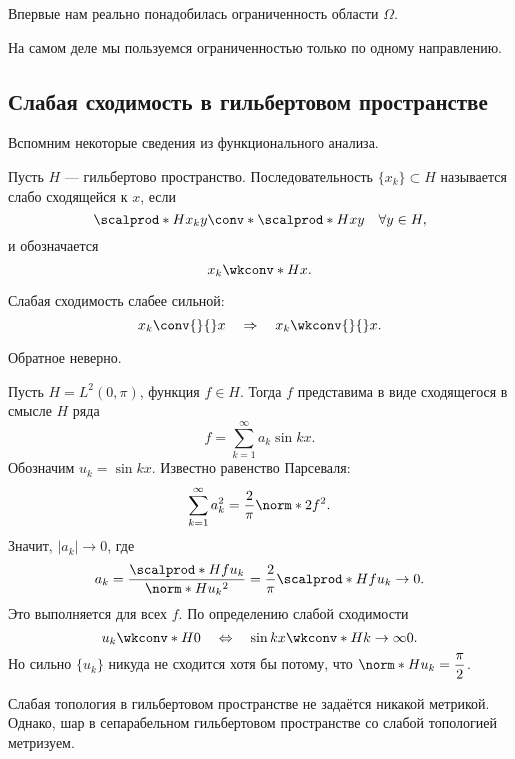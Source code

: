\begin{note}
Впервые нам реально понадобилась ограниченность области $\Omega$.
\end{note}

\begin{note}
На самом деле мы пользуемся ограниченностью только по одному направлению. 
\end{note}

\subsection{Слабая сходимость в гильбертовом пространстве}
Вспомним некоторые сведения из функционального анализа.
\begin{definition}
Пусть $H$ --- гильбертово пространство. Последовательность $\{x_k \} \subset H$ называется слабо сходящейся к $x$, если
$$\scalprod*{H}{x_k}{y} \conv*{}{} \scalprod*{H}{x}{y} \quad \forall y \in H,$$
и обозначается
$$ x_k \wkconv*{H}{} x.$$
\end{definition}

\begin{note}
Слабая сходимость слабее сильной:
$$ x_k \conv{}{} x \quad \Rightarrow \quad x_k \wkconv{}{} x.$$
\end{note}

\begin{note}
Обратное неверно.
\end{note}

\begin{example} Пусть $H = L^2(0, \pi)$, функция $f \in H$. Тогда $f$ представима в виде сходящегося в смысле $H$ ряда
$$ f = \sum_{k=1}^\infty a_k \sin kx.$$
Обозначим $u_k = \sin kx$. Известно равенство Парсеваля:
$$ \sum_{k=1}^\infty a_k^2 = \frac {2} {\pi} \norm*{2}{f}^2.$$
Значит, $|a_k| \to 0$, где
$$ a_k = \frac {\scalprod*{H}{f}{u_k}} {\norm*{H}{u_k}^2} = \frac {2} {\pi} \scalprod*{H}{f}{u_k} \to 0.$$
Это выполняется для всех $f$. По определению слабой сходимости
$$ u_k \wkconv*{H}{} 0 \quad \Leftrightarrow \quad \sin kx \wkconv*{H}{k \to \infty} 0.$$
Но сильно $\{ u_k \}$ никуда не сходится хотя бы потому, что $\displaystyle \norm*{H}{u_k} = \frac {\pi} {2}$.
\end{example}

\begin{note}
Слабая топология в гильбертовом пространстве не задаётся никакой метрикой. Однако, шар в сепарабельном гильбертовом пространстве со слабой топологией метризуем.
\end{note}

